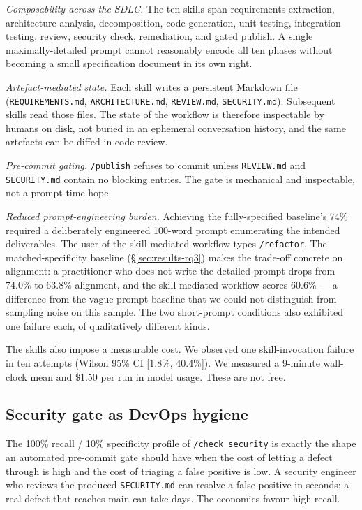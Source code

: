 \documentclass[journal]{IEEEtran}
\begin{document}
\textit{Composability across the SDLC.} The ten skills span
requirements extraction, architecture analysis, decomposition,
code generation, unit testing, integration testing, review,
security check, remediation, and gated publish. A single
maximally-detailed prompt cannot reasonably encode all ten phases
without becoming a small specification document in its own right.

\textit{Artefact-mediated state.} Each skill writes a persistent
Markdown file (\texttt{REQUIREMENTS.md}, \texttt{ARCHITECTURE.md},
\texttt{REVIEW.md}, \texttt{SECURITY.md}). Subsequent skills read
those files. The state of the workflow is therefore inspectable
by humans on disk, not buried in an ephemeral conversation history,
and the same artefacts can be diffed in code review.

\textit{Pre-commit gating.} \texttt{/publish} refuses to commit
unless \texttt{REVIEW.md} and \texttt{SECURITY.md} contain no
blocking entries. The gate is mechanical and inspectable, not a
prompt-time hope.

\textit{Reduced prompt-engineering burden.} Achieving the
fully-specified baseline's 74\% required a deliberately engineered
100-word prompt enumerating the intended deliverables. The user
of the skill-mediated workflow types \texttt{/refactor}. The
matched-specificity baseline (\S\ref{sec:results-rq3}) makes the
trade-off concrete on alignment: a practitioner who does not write
the detailed prompt drops from 74.0\% to 63.8\% alignment, and the
skill-mediated workflow scores 60.6\% --- a difference from the
vague-prompt baseline that we could not distinguish from sampling
noise on this sample. The two short-prompt conditions also
exhibited one failure each, of qualitatively different kinds.

The skills also impose a measurable cost. We observed one
skill-invocation failure in ten attempts (Wilson 95\% CI [1.8\%,
40.4\%]). We measured a 9-minute wall-clock mean and \$1.50 per
run in model usage. These are not free.

\subsection{Security gate as DevOps hygiene}

The 100\% recall / 10\% specificity profile of
\texttt{/check\_security} is exactly the shape an automated
pre-commit gate should have when the cost of letting a defect
through is high and the cost of triaging a false positive is low.
A security engineer who reviews the produced
\texttt{SECURITY.md} can resolve a false positive in seconds; a
real defect that reaches main can take days. The economics favour
high recall.
\end{document}
